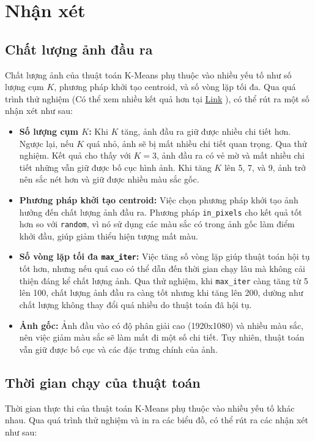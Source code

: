 \section{Nhận xét}
\subsection{Chất lượng ảnh đầu ra}

Chất lượng ảnh của thuật toán K-Means phụ thuộc vào nhiều yếu tố như số lượng cụm $K$, phương pháp khởi tạo centroid, và số vòng lặp tối đa. Qua quá trình thử nghiệm (Có thể xem nhiều kết quả hơn tại \href{https://drive.google.com/drive/folders/1m5YjBhpyRnWi9D8ORrR4YCIUSnBUiQtU?usp=sharing}{Link} ), có thể rút ra một số nhận xét như sau:
\begin{itemize}
	\item \textbf{Số lượng cụm $K$:} Khi $K$ tăng, ảnh đầu ra giữ được nhiều chi tiết hơn. Ngược lại, nếu $K$ quá nhỏ, ảnh sẽ bị mất nhiều chi tiết quan trọng. Qua thử nghiệm. Kết quả cho thấy với $K = 3$, ảnh đầu ra có vẻ mờ và mất nhiều chi tiết những vẫn giữ được bố cục hình ảnh. Khi tăng $K$ lên 5, 7, và 9, ảnh trở nên sắc nét hơn và giữ được nhiều màu sắc gốc.
	\item \textbf{Phương pháp khởi tạo centroid:} Việc chọn phương pháp khởi tạo ảnh hưởng đến chất lượng ảnh đầu ra. Phương pháp \texttt{in\_pixels} cho kết quả tốt hơn so với \texttt{random}, vì nó sử dụng các màu sắc có trong ảnh gốc làm điểm khởi đầu, giúp giảm thiểu hiện tượng mất màu.
	\item \textbf{Số vòng lặp tối đa \texttt{max\_iter}:} Việc tăng số vòng lặp giúp thuật toán hội tụ tốt hơn, nhưng nếu quá cao có thể dẫn đến thời gian chạy lâu mà không cải thiện đáng kể chất lượng ảnh. Qua thử nghiệm, khi \texttt{max\_iter} càng tăng từ 5 lên 100, chất lượng ảnh đầu ra càng tốt nhưng khi tăng lên 200, dường như chất lượng không thay đổi quá nhiều do thuật toán đã hội tụ.
	\item \textbf{Ảnh gốc:} Ảnh đầu vào có độ phân giải cao (1920x1080) và nhiều màu sắc, nên việc giảm màu sắc sẽ làm mất đi một số chi tiết. Tuy nhiên, thuật toán vẫn giữ được bố cục và các đặc trưng chính của ảnh.
\end{itemize}


\subsection{Thời gian chạy của thuật toán}

Thời gian thực thi của thuật toán K-Means phụ thuộc vào nhiều yếu tố khác nhau. Qua quá trình thử nghiệm và in ra các biểu đồ, có thể rút ra các nhận xét như sau:

